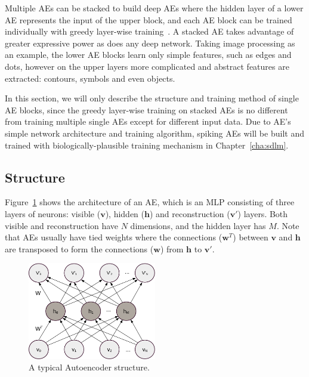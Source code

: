 Multiple AEs can be stacked to build deep AEs where the hidden layer of a lower AE represents the input of the upper block, and each AE block can be trained individually with greedy layer-wise training~\DIFdelbegin {}\DIFdelend \DIFaddbegin {}\DIFaddend .
A stacked AE takes advantage of greater expressive power as does any deep network.
Taking image processing as an example, the lower AE blocks learn only simple features, such as edges and dots, however on the upper layers more complicated and abstract features are extracted: contours, symbols and even objects. 

In this section, we will only describe the structure and training method of single AE blocks, since the greedy layer-wise training on stacked AEs is no different from training multiple single AEs except for different input data.
Due to \DIFaddbegin {}\DIFaddend AE's simple network architecture and training algorithm, spiking AEs will be built and trained with \DIFaddbegin {}\DIFaddend biologically-plausible training mechanism in Chapter~\ref{cha:sdlm}.

\subsection{Structure}
Figure~\ref{fig:AE} shows the architecture of an AE, which is an MLP consisting of three layers of neurons: \DIFaddbegin {}\DIFaddend visible ($\mathbf{v}$), hidden ($\mathbf{h}$) and reconstruction ($\mathbf{v'}$) layers.
Both visible and reconstruction \DIFdelbegin {}\DIFdelend \DIFaddbegin {}\DIFaddend have $N$ dimensions, and the hidden layer has $M$.
Note that AEs usually have tied weights where the connections ($\mathbf{w}^T$) between $\mathbf{v}$ and $\mathbf{h}$ are transposed to form the connections ($\mathbf{w}$) from $\mathbf{h}$ to $\mathbf{v'}$.


\begin{figure}
	\centering
	\includegraphics[width=0.5\textwidth]{pics_sdlm/AE.pdf}
	\caption{A typical Autoencoder structure.}
	\label{fig:AE}
\end{figure}


